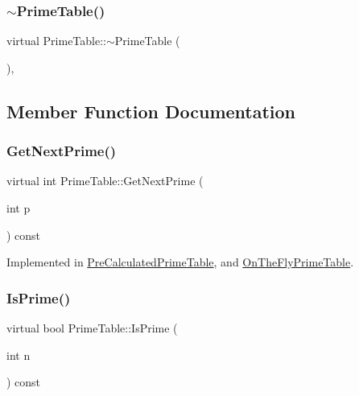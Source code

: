 \subsubsection{\texorpdfstring{$\sim$\+Prime\+Table()}{~PrimeTable()}}
{\footnotesize\ttfamily virtual Prime\+Table\+::$\sim$\+Prime\+Table (\begin{DoxyParamCaption}{ }\end{DoxyParamCaption})\hspace{0.3cm}{\ttfamily [inline]}, {\ttfamily [virtual]}}



\subsection{Member Function Documentation}
\mbox{\label{classPrimeTable_ae537c939f56617d8937d57bbbae3ab30}} 
\subsubsection{\texorpdfstring{Get\+Next\+Prime()}{GetNextPrime()}}
{\footnotesize\ttfamily virtual int Prime\+Table\+::\+Get\+Next\+Prime (\begin{DoxyParamCaption}\item[{int}]{p }\end{DoxyParamCaption}) const\hspace{0.3cm}{\ttfamily [pure virtual]}}



Implemented in \hyperlink{classPreCalculatedPrimeTable_a0b99de0a790db9f0cc2b3cd4b527fd5a}{Pre\+Calculated\+Prime\+Table}, and \hyperlink{classOnTheFlyPrimeTable_a0f6f934f318407a812098e67584b60bf}{On\+The\+Fly\+Prime\+Table}.

\mbox{\label{classPrimeTable_a2ab9243364ded0c51541f641b2df362a}} 
\subsubsection{\texorpdfstring{Is\+Prime()}{IsPrime()}}
{\footnotesize\ttfamily virtual bool Prime\+Table\+::\+Is\+Prime (\begin{DoxyParamCaption}\item[{int}]{n }\end{DoxyParamCaption}) const\hspace{0.3cm}{\ttfamily [pure virtual]}}



